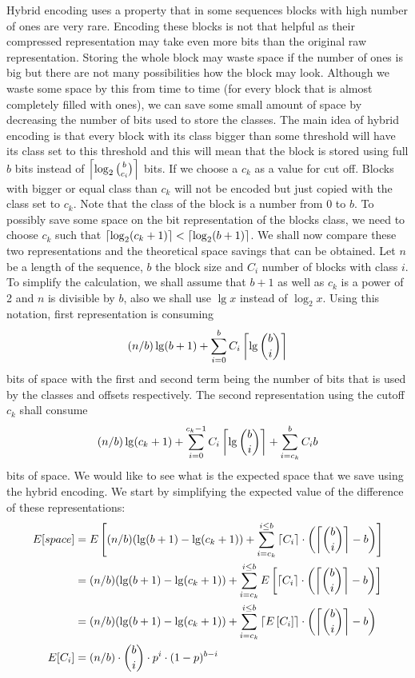 Hybrid encoding uses a property that in some sequences blocks with high number
of ones are very rare. Encoding these blocks is not that helpful as their
compressed representation may take even more bits than the original raw
representation. Storing the whole block may waste space if the number of
ones is big but there are not many possibilities how the block may look.
Although we waste some space by this from time to time (for every
block that is almost completely filled with ones), we can save some small
amount of space by decreasing the number of bits used to store the classes.
The main idea of hybrid encoding is that every block with its
class bigger than some threshold will have its class set to this threshold
and this will mean that the block is stored using full $b$ bits instead of
$\left\lceil \log_2{b\choose c_i} \right\rceil$ bits. If we choose a $c_k$ as a value for cut off.
Blocks with bigger or equal class than $c_k$ will not be encoded but just
copied with the class set to $c_k$. Note that the class of the block
is a number from 0 to $b$. To possibly save some space on the bit representation
of the blocks class, we need to choose $c_k$ such that $\left\lceil \log_2(c_k+1) \right\rceil < \left\lceil \log_2(b+1) \right\rceil$.
We shall now compare these two representations and the theoretical space savings that
can be obtained. Let $n$ be a length of the sequence, $b$ the block size and $C_i$
number of blocks with class $i$. To simplify the calculation, we shall assume that $b+1$
as well as $c_k$ is a power of 2 and $n$ is divisible by $b$, also we shall
use $\lg x$ instead of $\log_2 x$. Using this notation, first representation is
consuming $$(n/b)\lg (b+1) + \sum_{i=0}^{b} C_i\left\lceil \lg {b\choose i} \right\rceil$$
bits of space with the first and second term being the number of bits that
is used by the classes and offsets respectively. The second representation
using the cutoff $c_k$ shall consume $$(n/b)\lg (c_k+1)+\sum_{i=0}^{c_k-1}C_i\left\lceil \lg {b\choose i} \right\rceil + \sum_{i=c_k}^{b}C_i b$$
bits of space. We would like to see what is the expected space that we save
using the hybrid encoding. We start by simplifying the expected value of the
difference of these representations:
\begin{align}
E[space] &= E\left[(n/b)(\lg(b+1)-\lg(c_k+1)) + \sum_{i=c_k}^{i\leq b}\left\lceil C_i \right\rceil\cdot \left(\left\lceil {b\choose i} \right\rceil - b\right)\right] \nonumber\\
&=(n/b)(\lg(b+1)-\lg(c_k+1)) + \sum_{i=c_k}^{i\leq b}E\left[\left\lceil C_i \right\rceil\cdot \left(\left\lceil {b\choose i} \right\rceil - b\right)\right] \nonumber\\
&=(n/b)(\lg(b+1)-\lg(c_k+1)) + \sum_{i=c_k}^{i\leq b}\left\lceil E\left[C_i\right] \right\rceil\cdot \left(\left\lceil {b\choose i} \right\rceil - b\right) \nonumber\\
E[C_i] &= (n/b)\cdot {b\choose i}\cdot p^i\cdot (1-p)^{b-i} \label{eq:hybrid_encoding_expected_c_i}
\end{align}

